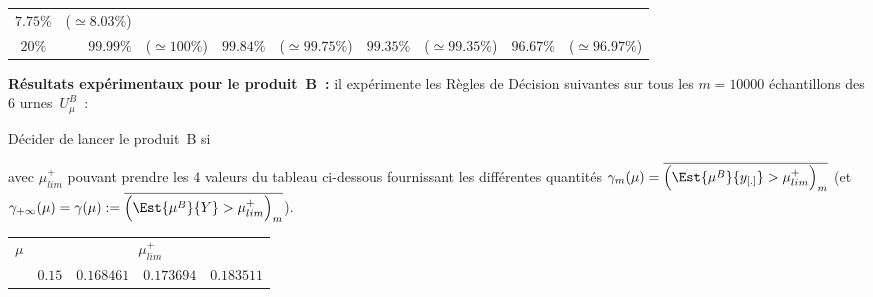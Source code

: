 \documentclass[10pt]{report}
\begin{document}
\begin{exercice}
\begin{center}
\begin{tabular}{|c|rl|rl|rl|rl|}
        $7.75\%$
         & 
    
        ($\simeq8.03\%$)
        
    \\ 

    
        $20\%$
         & 
    
        $99.99\%$
         & 
    
        ($\simeq100\%$)
         & 
    
        $99.84\%$
         & 
    
        ($\simeq99.75\%$)
         & 
    
        $99.35\%$
         & 
    
        ($\simeq99.35\%$)
         & 
    
        $96.67\%$
         & 
    
        ($\simeq96.97\%$)
        
    \\ \cline{1-9}

    \end{tabular}

\end{center}

\noindent \textbf{Résultats expérimentaux pour le produit~B~:}
il expérimente les Règles de Décision suivantes sur tous les $m=10000$ échantillons des 6 urnes~$U^B_\mu$~:
\begin{center}
Décider de lancer le produit~B si 
\end{center} 
avec $\mu^+_{lim}$ pouvant prendre les 4 valeurs du tableau ci-dessous fournissant les différentes quantités $\gamma_m(\mu)=\overline{\Big(\Est{\mu^B}{y_{[.]}}>\mu^+_{lim}\Big)_m}$ (et $\gamma_{+\infty}(\mu)=\gamma(\mu):=\overline{\Big(\Est{\mu^B}{Y}>\mu^+_{lim}\Big)_m}$).
\begin{center}
\begin{tabular}{|c|rl|rl|rl|rl|}\cline{1-9}
        \multirow{2}{*}{$\mu$}
         & 
    \multicolumn{8}{c|}{$\mu^+_{lim}$}
    
    
    
    
    
    
    
    \\ \cline{2-9}

    
        
         & 
    \multicolumn{2}{c|}{$0.15$}
     & 
    \multicolumn{2}{c|}{$0.168461$}
     & 
    \multicolumn{2}{c|}{$0.173694$}
     & 
    \multicolumn{2}{c|}{$0.183511$}
    

\end{tabular}
\end{center}
\end{exercice}
\end{document}
